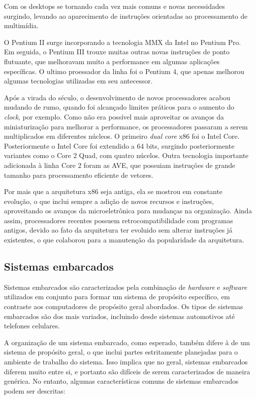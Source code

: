 \documentclass{article}
\begin{document}
Com os desktops se tornando cada vez mais comuns e novas necessidades surgindo,
levando ao aparecimento de instruções orientadas ao processamento de multimídia.

O Pentium II surge incorporando a tecnologia MMX da Intel no Pentium Pro. Em
seguida, o Pentium III trouxe muitas outras novas instruções de ponto flutuante,
que melhoravam muito a performance em algumas aplicações específicas. O ultimo
proessador da linha foi o Pentium 4, que apenas melhorou algumas tecnologias
utilizadas em seu antecessor.

Após a virada do século, o desenvolvimento de novos processadores acabou mudando
de rumo, quando foi alcançado limites práticos para o aumento do \textit{clock},
por exemplo. Como não era possível mais aproveitar os avanços da miniaturização
para melhorar a performance, os processadores passaram a serem multiplicados
em diferentes núcleos. O primeiro \textit{dual core} x86 foi o Intel Core.
Posteriormente o Intel Core foi extendido a 64 bits, surgindo posteriormente
variantes como o Core 2 Quad, com quatro núcelos. Outra tecnologia importante
adicionada à linha Core 2 foram as AVE, que possuiam instruções de grande
tamanho para processamento eficiente de vetores.

Por mais que a arquitetura x86 seja antiga, ela se mostrou em constante
evolução, o que inclui sempre a adição de novos recursos e instruções,
aproveitando os avanços da microeletrônica para mudanças na organização. Ainda
assim, processadores recentes possuem retrocompatibilidade com programas
antigos, devido ao fato da arquitetura ter evoluido sem alterar instruções já
existentes, o que colaborou para a manutenção da popularidade da arquitetura.

\subsection{Sistemas embarcados}
Sistemas embarcados são caracterizados pela combinação de
\textit{hardware} e \textit{software} utilizados em conjunto para
formar um sistema de propósito específico, em contraste aos
computadores de propósito geral abordados. Os tipos de sistemas
embarcados são dos mais variados, incluindo desde sistemas automotivos
até telefones celulares.

A organização de um sistema embarcado, como esperado, também difere à
de um sistema de propósito geral, o que inclui partes estritamente
planejadas para o ambiente de trabalho do sistema. Isso implica que no
geral, sistemas embarcados diferem muito entre si, e portanto são
difíceis de serem caracterizados de maneira genérica. No entanto,
algumas características comuns de sistemas embarcados podem ser
descritas:
\end{document}
